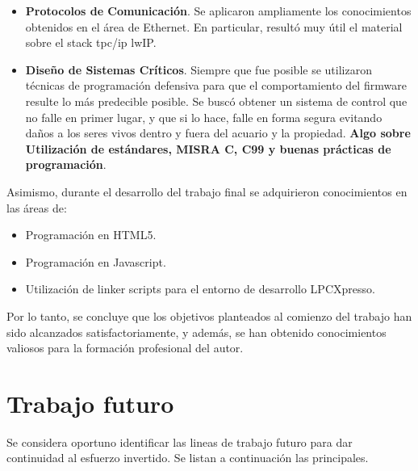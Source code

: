 \begin{itemize}
\item 
\textbf{Protocolos de Comunicación}. Se aplicaron ampliamente los conocimientos obtenidos en el área de Ethernet. En particular, resultó muy útil el material sobre el stack tpc/ip lwIP.

\item
\textbf{Diseño de Sistemas Críticos}. Siempre que fue posible se utilizaron técnicas de programación defensiva para que el comportamiento del firmware resulte lo más predecible posible.  Se buscó obtener un sistema de control que no falle en primer lugar, y que si lo hace, falle en forma segura evitando daños a los seres vivos dentro y fuera del acuario y la propiedad. \textbf{Algo sobre Utilización de estándares, MISRA C, C99 y buenas prácticas de programación}.
\end{itemize}



\medskip

\noindent Asimismo, durante el desarrollo del trabajo final se adquirieron conocimientos en las áreas de:

\begin{itemize}
	\item Programación en HTML5.
	\item Programación en Javascript.  
	\item Utilización de linker scripts para el entorno de desarrollo LPCXpresso.
\end{itemize}


\medskip

Por lo tanto, se concluye que los objetivos planteados al comienzo del trabajo han sido alcanzados satisfactoriamente, y además, se han obtenido conocimientos valiosos para la formación profesional del autor.

\clearpage
\section{Trabajo futuro}

Se considera oportuno identificar las lineas de trabajo futuro para dar continuidad al esfuerzo invertido.  Se listan a continuación las principales.

